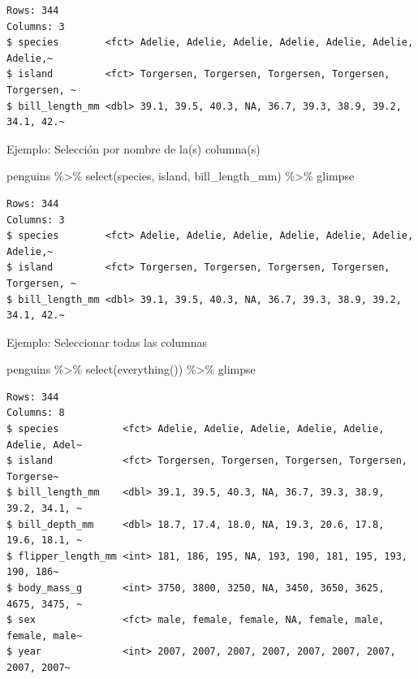 \documentclass[
  letterpaper,
  DIV=11,
  numbers=noendperiod]{scrreprt}
\newenvironment{Shaded}{\begin{snugshade}}{\end{snugshade}}
\newcommand{\FunctionTok}[1]{\textcolor[rgb]{0.28,0.35,0.67}{#1}}
\newcommand{\NormalTok}[1]{\textcolor[rgb]{0.00,0.23,0.31}{#1}}
\newcommand{\SpecialCharTok}[1]{\textcolor[rgb]{0.37,0.37,0.37}{#1}}
\begin{document}
\begin{verbatim}
Rows: 344
Columns: 3
$ species        <fct> Adelie, Adelie, Adelie, Adelie, Adelie, Adelie, Adelie,~
$ island         <fct> Torgersen, Torgersen, Torgersen, Torgersen, Torgersen, ~
$ bill_length_mm <dbl> 39.1, 39.5, 40.3, NA, 36.7, 39.3, 38.9, 39.2, 34.1, 42.~
\end{verbatim}

{Ejemplo}: Selección por nombre de la(s) columna(s)

\begin{Shaded}
\begin{Highlighting}[]
\NormalTok{penguins }\SpecialCharTok{\%\textgreater{}\%} 
  \FunctionTok{select}\NormalTok{(species, island, bill\_length\_mm) }\SpecialCharTok{\%\textgreater{}\%} 
\NormalTok{  glimpse}
\end{Highlighting}
\end{Shaded}

\begin{verbatim}
Rows: 344
Columns: 3
$ species        <fct> Adelie, Adelie, Adelie, Adelie, Adelie, Adelie, Adelie,~
$ island         <fct> Torgersen, Torgersen, Torgersen, Torgersen, Torgersen, ~
$ bill_length_mm <dbl> 39.1, 39.5, 40.3, NA, 36.7, 39.3, 38.9, 39.2, 34.1, 42.~
\end{verbatim}

{Ejemplo}: Seleccionar todas las columnas

\begin{Shaded}
\begin{Highlighting}[]
\NormalTok{penguins }\SpecialCharTok{\%\textgreater{}\%} 
  \FunctionTok{select}\NormalTok{(}\FunctionTok{everything}\NormalTok{()) }\SpecialCharTok{\%\textgreater{}\%} 
\NormalTok{  glimpse}
\end{Highlighting}
\end{Shaded}

\begin{verbatim}
Rows: 344
Columns: 8
$ species           <fct> Adelie, Adelie, Adelie, Adelie, Adelie, Adelie, Adel~
$ island            <fct> Torgersen, Torgersen, Torgersen, Torgersen, Torgerse~
$ bill_length_mm    <dbl> 39.1, 39.5, 40.3, NA, 36.7, 39.3, 38.9, 39.2, 34.1, ~
$ bill_depth_mm     <dbl> 18.7, 17.4, 18.0, NA, 19.3, 20.6, 17.8, 19.6, 18.1, ~
$ flipper_length_mm <int> 181, 186, 195, NA, 193, 190, 181, 195, 193, 190, 186~
$ body_mass_g       <int> 3750, 3800, 3250, NA, 3450, 3650, 3625, 4675, 3475, ~
$ sex               <fct> male, female, female, NA, female, male, female, male~
$ year              <int> 2007, 2007, 2007, 2007, 2007, 2007, 2007, 2007, 2007~
\end{verbatim}
\end{document}

